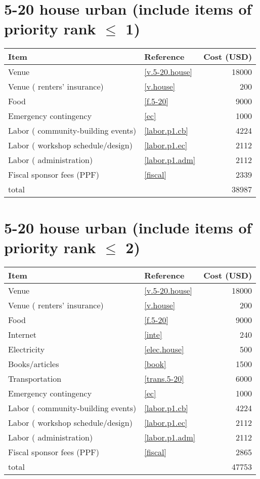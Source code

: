\section*{5-20 house urban (include items of priority rank $\leq$ 1)}
\begin{center}
\begin{tabular}{llr}
Item & Reference & Cost (USD) \\ \hline
Venue & \ref{v.5-20.house} & 18000 \\
Venue ( renters' insurance) & \ref{v.house} & 200 \\
Food & \ref{f.5-20} & 9000 \\
Emergency contingency & \ref{ec} & 1000 \\
Labor ( community-building events) & \ref{labor.p1.cb} & 4224 \\
Labor ( workshop schedule/design) & \ref{labor.p1.ec} & 2112 \\
Labor ( administration) & \ref{labor.p1.adm} & 2112 \\
Fiscal sponsor fees (PPF) & \ref{fiscal} & 2339 \\ \hline
total &  & 38987
\end{tabular}
\end{center}
\newpage
\section*{5-20 house urban (include items of priority rank $\leq$ 2)}
\begin{center}
\begin{tabular}{llr}
Item & Reference & Cost (USD) \\ \hline
Venue & \ref{v.5-20.house} & 18000 \\
Venue ( renters' insurance) & \ref{v.house} & 200 \\
Food & \ref{f.5-20} & 9000 \\
Internet & \ref{inte} & 240 \\
Electricity & \ref{elec.house} & 500 \\
Books/articles & \ref{book} & 1500 \\
Transportation & \ref{trans.5-20} & 6000 \\
Emergency contingency & \ref{ec} & 1000 \\
Labor ( community-building events) & \ref{labor.p1.cb} & 4224 \\
Labor ( workshop schedule/design) & \ref{labor.p1.ec} & 2112 \\
Labor ( administration) & \ref{labor.p1.adm} & 2112 \\
Fiscal sponsor fees (PPF) & \ref{fiscal} & 2865 \\ \hline
total &  & 47753
\end{tabular}
\end{center}
\newpage
